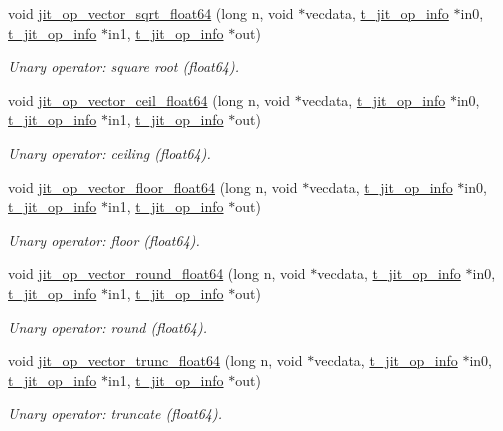 \begin{DoxyCompactItemize}
void \hyperlink{group__opvecmod_gae98261c46b7a3bb453df46f75d8aa75e}{jit\_\-op\_\-vector\_\-sqrt\_\-float64} (long n, void $\ast$vecdata, \hyperlink{structt__jit__op__info}{t\_\-jit\_\-op\_\-info} $\ast$in0, \hyperlink{structt__jit__op__info}{t\_\-jit\_\-op\_\-info} $\ast$in1, \hyperlink{structt__jit__op__info}{t\_\-jit\_\-op\_\-info} $\ast$out)
\begin{DoxyCompactList}\small\item\em Unary operator: square root (float64). \item\end{DoxyCompactList}\item 
void \hyperlink{group__opvecmod_gaeb31ea93e3970f6ee34a46b9e89c294d}{jit\_\-op\_\-vector\_\-ceil\_\-float64} (long n, void $\ast$vecdata, \hyperlink{structt__jit__op__info}{t\_\-jit\_\-op\_\-info} $\ast$in0, \hyperlink{structt__jit__op__info}{t\_\-jit\_\-op\_\-info} $\ast$in1, \hyperlink{structt__jit__op__info}{t\_\-jit\_\-op\_\-info} $\ast$out)
\begin{DoxyCompactList}\small\item\em Unary operator: ceiling (float64). \item\end{DoxyCompactList}\item 
void \hyperlink{group__opvecmod_ga4dd92a9aaa3d3fa78864561cfa386087}{jit\_\-op\_\-vector\_\-floor\_\-float64} (long n, void $\ast$vecdata, \hyperlink{structt__jit__op__info}{t\_\-jit\_\-op\_\-info} $\ast$in0, \hyperlink{structt__jit__op__info}{t\_\-jit\_\-op\_\-info} $\ast$in1, \hyperlink{structt__jit__op__info}{t\_\-jit\_\-op\_\-info} $\ast$out)
\begin{DoxyCompactList}\small\item\em Unary operator: floor (float64). \item\end{DoxyCompactList}\item 
void \hyperlink{group__opvecmod_ga4f3eeb3b5ef9cb726fcb7fb06827528d}{jit\_\-op\_\-vector\_\-round\_\-float64} (long n, void $\ast$vecdata, \hyperlink{structt__jit__op__info}{t\_\-jit\_\-op\_\-info} $\ast$in0, \hyperlink{structt__jit__op__info}{t\_\-jit\_\-op\_\-info} $\ast$in1, \hyperlink{structt__jit__op__info}{t\_\-jit\_\-op\_\-info} $\ast$out)
\begin{DoxyCompactList}\small\item\em Unary operator: round (float64). \item\end{DoxyCompactList}\item 
void \hyperlink{group__opvecmod_gac2f5fb251d5b09fdb1aa28ec6735b27b}{jit\_\-op\_\-vector\_\-trunc\_\-float64} (long n, void $\ast$vecdata, \hyperlink{structt__jit__op__info}{t\_\-jit\_\-op\_\-info} $\ast$in0, \hyperlink{structt__jit__op__info}{t\_\-jit\_\-op\_\-info} $\ast$in1, \hyperlink{structt__jit__op__info}{t\_\-jit\_\-op\_\-info} $\ast$out)
\begin{DoxyCompactList}\small\item\em Unary operator: truncate (float64). \item\end{DoxyCompactList}\end{DoxyCompactItemize}


